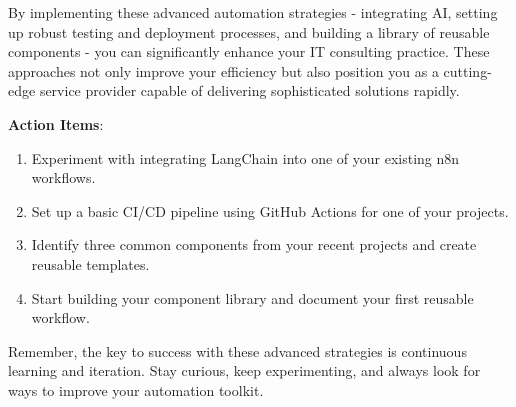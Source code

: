 By implementing these advanced automation strategies - integrating AI, setting up robust testing and deployment processes, and building a library of reusable components - you can significantly enhance your IT consulting practice. These approaches not only improve your efficiency but also position you as a cutting-edge service provider capable of delivering sophisticated solutions rapidly.

\textbf{Action Items}:
\begin{enumerate}
    \item Experiment with integrating LangChain into one of your existing n8n workflows.
    \item Set up a basic CI/CD pipeline using GitHub Actions for one of your projects.
    \item Identify three common components from your recent projects and create reusable templates.
    \item Start building your component library and document your first reusable workflow.
\end{enumerate}

Remember, the key to success with these advanced strategies is continuous learning and iteration. Stay curious, keep experimenting, and always look for ways to improve your automation toolkit.

